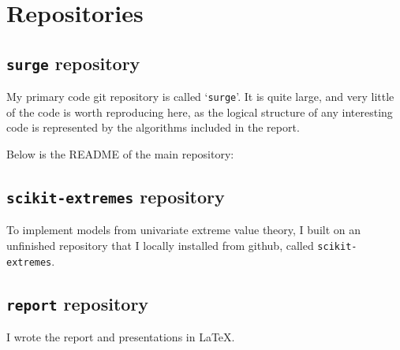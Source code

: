 \section{Repositories}
\subsection{\texttt{surge} repository}

My primary code git repository is called `\texttt{surge}'.
It is quite large, and very little of the code is worth reproducing here,
as the logical structure of any interesting code is represented by the
algorithms included in the report.



Below is the README of the main repository:



\subsection{\texttt{scikit-extremes} repository}

To implement models from univariate extreme value theory, I built
on an unfinished repository that I locally installed from github,
called \texttt{scikit-extremes}.



\subsection{\texttt{report} repository}

I wrote the report and presentations in \LaTeX.


